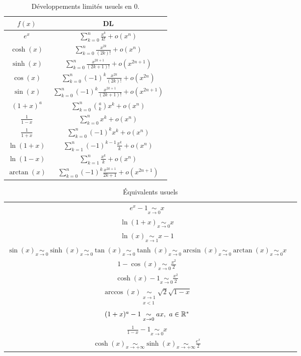 \begin{table}[!h]
    \centering
    \begin{tabular}{cc}
         \toprule
         $f(x)$ & DL \\ 
         \midrule
         $e^x$ & $\sum_{k=0}^n \frac{x^k}{k!} + o(x^n)$ \\
         $\cosh(x)$ & $ \sum_{k=0}^n \frac{x^{2k}}{(2k)!} + o(x^n)$ \\
         $\sinh(x)$ & $ \sum_{k=0}^n \frac{x^{2k + 1}}{(2k + 1)!} + o(x^{2n + 1})$ \\
         $\cos(x)$ & $ \sum_{k=0}^n (-1)^k \frac{x^{2k}}{(2k)!} + o(x^{2n})$ \\
         $\sin(x)$ & $ \sum_{k=0}^n (-1)^k \frac{x^{2k+1}}{(2k+1)!} + o(x^{2n + 1})$ \\
         $(1 + x)^{a}$ & $ \sum_{k=0}^n \binom{a}{k} x^k + o(x^n)$ \\ 
         $\frac{1}{1 - x}$ & $ \sum_{k=0}^n x^k + o(x^n)$ \\ 
         $\frac{1}{1 + x}$ & $ \sum_{k=0}^n (-1)^k x^k + o(x^n)$ \\ 
         $\ln(1 + x)$ & $ \sum_{k=1}^n (-1)^{k - 1} \frac{x^k}{k} + o(x^n)$ \\ 
         $\ln(1 - x)$ & $ \sum_{k=1}^n \frac{x^k}{k} + o(x^n)$ \\ 
         $\arctan(x)$ & $ \sum_{k=0}^n (-1)^k \frac{x^{2k+1}}{2k+1} + o(x^{2n+1})$ \\
         \bottomrule
    \end{tabular}
    \caption{Développements limités usuels en 0.}
    \label{tab:dl_usuels}
\end{table}

\begin{table}[!h]
    \centering
    \begin{tabular}{cc}
         \toprule 
         $e^x - 1 \underset{x \to 0}{\sim} x$ \\
         $\ln(1+x) \underset{x \to 0}{\sim} x$ \\
         $\ln(x) \underset{x \to 1}{\sim} x - 1$ \\ 
         $\sin(x) \underset{x \to 0}{\sim} \sinh(x) \underset{x \to 0}{\sim} \tan(x) \underset{x \to 0}{\sim} \tanh(x) \underset{x \to 0}{\sim} \arcsin(x) \underset{x \to 0}{\sim} \arctan(x) \underset{x \to 0}{\sim} x$ \\ 
         $1 - \cos(x) \underset{x \to 0}{\sim} \frac{x^2}{2}$ \\ 
         $\cosh(x) - 1 \underset{x \to 0}{\sim} \frac{x^2}{2}$ \\ 
         $\arccos(x) \underset{\substack{x \to 1 \\ x < 1}}{\sim} \sqrt{2}\sqrt{1-x}$ \\ 
         $(1 + x)^a - 1 \underset{x \to 0}{\sim} ax,\ a \in \mathbb{R}^*$ \\ 
         $\frac{1}{1-x} - 1 \underset{x \to 0}{\sim} x$ \\ 
         $\cosh(x) \underset{x \to +\infty}{\sim} \sinh(x) \underset{x \to +\infty}{\sim} \frac{e^x}{2}$ \\ 
         \bottomrule
    \end{tabular}
    \caption{\'Equivalents usuels}
    \label{tab:equiv_usuels}
\end{table}